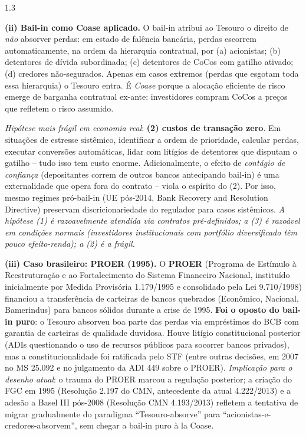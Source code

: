 \documentclass[11pt,addpoints]{exam}
\begin{document}
\begin{spacing}{1.3}
\begin{questions}
\begin{parts}
\begin{solution}
\textbf{(ii) Bail-in como Coase aplicado.} O bail-in atribui ao Tesouro o direito de \emph{não} absorver perdas: em estado de falência bancária, perdas escorrem automaticamente, na ordem da hierarquia contratual, por (a) acionistas; (b) detentores de dívida subordinada; (c) detentores de CoCos com gatilho ativado; (d) credores não-segurados. Apenas em casos extremos (perdas que esgotam toda essa hierarquia) o Tesouro entra. É \emph{Coase} porque a alocação eficiente de risco emerge de barganha contratual ex-ante: investidores compram CoCos a preços que refletem o risco assumido.

\emph{Hipótese mais frágil em economia real}: \textbf{(2) custos de transação zero}. Em situações de estresse sistêmico, identificar a ordem de prioridade, calcular perdas, executar conversões automáticas, lidar com litígios de detentores que disputam o gatilho -- tudo isso tem custo enorme. Adicionalmente, o efeito de \emph{contágio de confiança} (depositantes correm de outros bancos antecipando bail-in) é uma externalidade que opera fora do contrato -- viola o espírito do (2). Por isso, mesmo regimes pró-bail-in (UE pós-2014, Bank Recovery and Resolution Directive) preservam discricionariedade do regulador para casos sistêmicos. \emph{A hipótese (1) é razoavelmente atendida via contratos pré-definidos; a (3) é razoável em condições normais (investidores institucionais com portfólio diversificado têm pouco efeito-renda); a (2) é a frágil.}

\textbf{(iii) Caso brasileiro: PROER (1995).} O \textbf{PROER} (Programa de Estímulo à Reestruturação e ao Fortalecimento do Sistema Financeiro Nacional, instituído inicialmente por Medida Provisória 1.179/1995 e consolidado pela Lei 9.710/1998) financiou a transferência de carteiras de bancos quebrados (Econômico, Nacional, Bamerindus) para bancos sólidos durante a crise de 1995. \textbf{Foi o oposto do bail-in puro}: o Tesouro absorveu boa parte das perdas via empréstimos do BCB com garantia de carteiras de qualidade duvidosa. Houve litígio constitucional posterior (ADIs questionando o uso de recursos públicos para socorrer bancos privados), mas a constitucionalidade foi ratificada pelo STF (entre outras decisões, em 2007 no MS 25.092 e no julgamento da ADI 449 sobre o PROER). \textit{Implicação para o desenho atual}: o trauma do PROER marcou a regulação posterior; a criação do FGC em 1995 (Resolução 2.197 do CMN, antecedente da atual 4.222/2013) e a adesão a Basel III pós-2008 (Resolução CMN 4.193/2013) refletem a tentativa de migrar gradualmente do paradigma ``Tesouro-absorve'' para ``acionistas-e-credores-absorvem'', sem chegar a bail-in puro à la Coase.
\end{solution}


\end{parts}
\end{questions}
\end{spacing}
\end{document}
